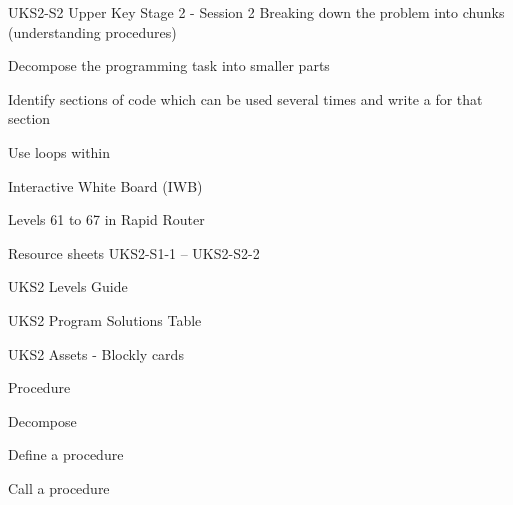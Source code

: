 \documentclass{../../../lessonplan}
\begin{document}
\lessonplantitle
    {UKS2-S2}
    {Upper Key Stage 2 - Session 2}
    {Breaking down the problem into chunks (understanding procedures)}

\preamble
    {
    \item Decompose the programming task into smaller parts
    \item Identify sections of code which can be used several times and write a  for that section
    \item Use  loops within 
    }
    {
    \item Interactive White Board (IWB)
    \item Levels 61 to 67 in Rapid Router
    \item Resource sheets UKS2-S1-1 -- UKS2-S2-2
    \item UKS2 Levels Guide
    \item UKS2 Program Solutions Table
    \item UKS2 Assets - Blockly cards
    }
    {
    \item Procedure
    \item Decompose
    \item Define a procedure
    \item Call a procedure
    }
\end{document}
